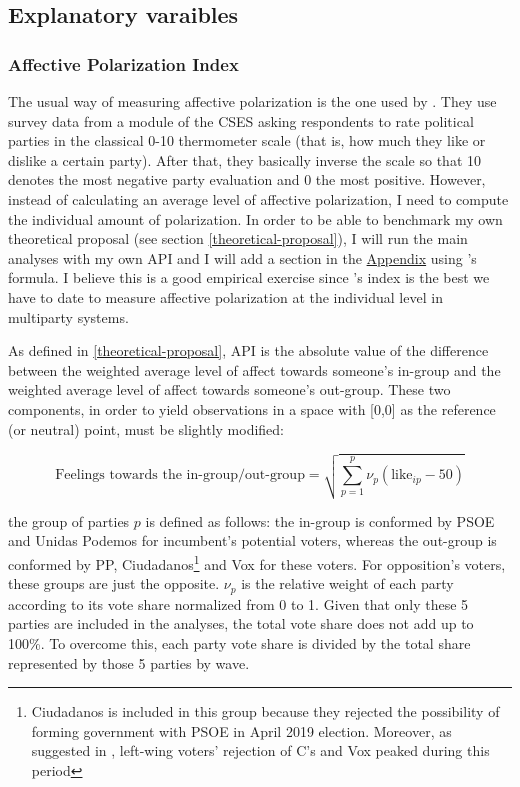 \documentclass[a4paper, svgnames]{article}
\newcommand{\citeposs}[1]{\citeauthor{#1}'s \citeyearpar{#1}}
\begin{document}
\subsection{Explanatory varaibles}

\subsubsection{Affective Polarization Index}

The usual way of measuring affective polarization is the one used by \cite{Gidron2018}. They use survey data from a module of the CSES asking respondents to rate political parties in the classical 0-10 thermometer scale (that is, how much they like or dislike a certain party). After that, they basically inverse the scale so that 10 denotes the most negative party evaluation and 0 the most positive. However, instead of calculating an average level of affective polarization, I need to compute the individual amount of polarization. In order to be able to benchmark my own theoretical proposal (see section \ref{theoretical-proposal}), I will run the main analyses with my own API and I will add a section in the \hyperref[appendix]{Appendix} using \citet{Wagner2021}'s formula. I believe this is a good empirical exercise since \citeposs{Wagner2021} index is the best we have to date to measure affective polarization at the individual level in multiparty systems.

As defined in \ref{theoretical-proposal}, API is the absolute value of the difference between the weighted average level of affect towards someone's in-group and the weighted average level of affect towards someone's out-group. These two components, in order to yield observations in a space with [0,0] as the reference (or neutral) point, must be slightly modified:

$$
	\text{Feelings towards the in-group/out-group} = \sqrt{\sum^p_{p=1}\nu_p(\text{like}_{ip}-50)}
$$

the group of parties $p$ is defined as follows: the in-group is conformed by PSOE and Unidas Podemos for incumbent's potential voters, whereas the out-group is conformed by PP, Ciudadanos\footnote{Ciudadanos is included in this group because they rejected the possibility of forming government with PSOE in April 2019 election. Moreover, as suggested in \citet*{Orriols2020}, left-wing voters' rejection of C's and Vox peaked during this period} and Vox for these voters. For opposition's voters, these groups are just the opposite. $\nu_p$ is the relative weight of each party according to its vote share normalized from 0 to 1. Given that only these 5 parties are included in the analyses, the total vote share does not add up to 100\%. To overcome this, each party vote share is divided by the total share represented by those 5 parties by wave.
\end{document}

